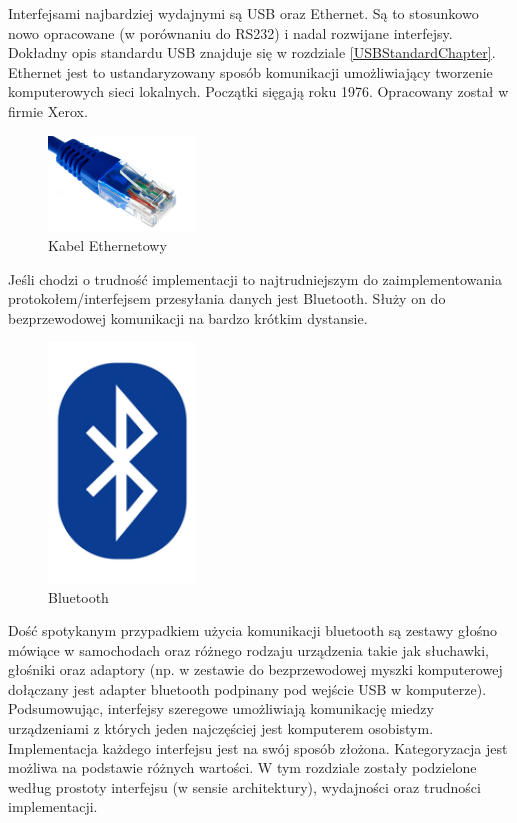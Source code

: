\documentclass{BscUS}
\begin{document}
\indent Interfejsami najbardziej wydajnymi są USB oraz Ethernet. Są to stosunkowo nowo opracowane (w porównaniu do RS232) i nadal rozwijane interfejsy. Dokładny opis standardu USB znajduje się w rozdziale \ref{USBStandardChapter}. Ethernet jest to ustandaryzowany sposób komunikacji umożliwiający tworzenie komputerowych sieci lokalnych. Początki sięgają roku 1976. Opracowany został w firmie Xerox.
\begin{figure}[H]
\centering
\includegraphics[width=0.35\textwidth]{./img/ethernet-cable}
\caption{Kabel Ethernetowy \cite{ethernetCable}}
\label{fig:EthernetCable}
\end{figure}
Jeśli chodzi o trudność implementacji to najtrudniejszym do zaimplementowania protokołem/interfejsem przesyłania danych jest Bluetooth. Służy on do bezprzewodowej komunikacji na bardzo krótkim dystansie.
\begin{figure}[H]
\centering
\includegraphics[width=0.35\textwidth]{./img/bluetooth-logo}
\caption{Bluetooth \cite{bluetooth}}
\label{fig:blueTooth}
\end{figure}
Dość spotykanym przypadkiem użycia komunikacji bluetooth są zestawy głośno mówiące w samochodach oraz różnego rodzaju urządzenia takie jak słuchawki, głośniki oraz adaptory (np. w zestawie do bezprzewodowej myszki komputerowej dołączany jest adapter bluetooth podpinany pod wejście USB w komputerze).
\newline
\indent Podsumowując, interfejsy szeregowe umożliwiają komunikację miedzy urządzeniami z których jeden najczęściej jest komputerem osobistym. Implementacja każdego interfejsu jest na swój sposób złożona. Kategoryzacja jest możliwa na podstawie różnych wartości. W tym rozdziale zostały podzielone według prostoty interfejsu (w sensie architektury), wydajności oraz trudności implementacji.
\end{document}
